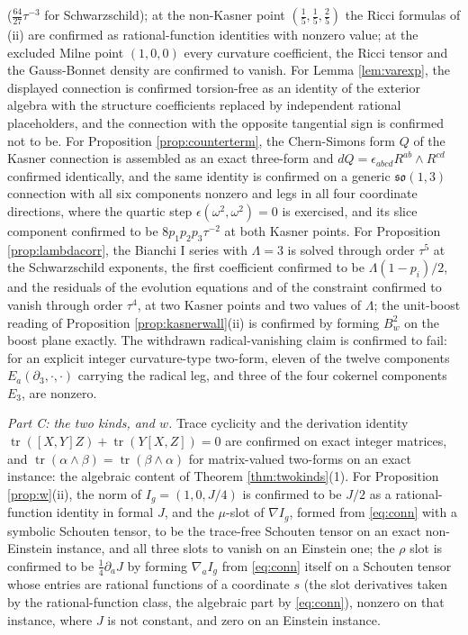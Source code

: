 \documentclass[11pt]{article}
\theoremstyle{definition}
\begin{document}
($\tfrac{64}{27}\tau^{-3}$ for Schwarzschild); at the non-Kasner point $(\tfrac15,\tfrac15,\tfrac25)$ the Ricci formulas of (ii) are confirmed as rational-function identities with nonzero value; at the excluded Milne point $(1,0,0)$ every curvature coefficient, the Ricci tensor and the Gauss-Bonnet density are confirmed to vanish. For Lemma \ref{lem:varexp}, the displayed connection is confirmed torsion-free as an identity of the exterior algebra with the structure coefficients replaced by independent rational placeholders, and the connection with the opposite tangential sign is confirmed not to be. For Proposition \ref{prop:counterterm}, the Chern-Simons form $Q$ of the Kasner connection is assembled as an exact three-form and $dQ = \epsilon_{abcd}R^{ab}\wedge R^{cd}$ confirmed identically, and the same identity is confirmed on a generic $\mathfrak{so}(1,3)$ connection with all six components nonzero and legs in all four coordinate directions, where the quartic step $\epsilon(\omega^2,\omega^2) = 0$ is exercised, and its slice component confirmed to be $8p_1p_2p_3\tau^{-2}$ at both Kasner points. For Proposition \ref{prop:lambdacorr}, the Bianchi I series with $\Lambda = 3$ is solved through order $\tau^5$ at the Schwarzschild exponents, the first coefficient confirmed to be $\Lambda(1-p_i)/2$, and the residuals of the evolution equations and of the constraint confirmed to vanish through order $\tau^4$, at two Kasner points and two values of $\Lambda$; the unit-boost reading of Proposition \ref{prop:kasnerwall}(ii) is confirmed by forming $B_w^2$ on the boost plane exactly. The withdrawn radical-vanishing claim is confirmed to fail: for an explicit integer curvature-type two-form, eleven of the twelve components $E_a(\partial_3, \cdot, \cdot)$ carrying the radical leg, and three of the four cokernel components $E_3$, are nonzero.

\emph{Part C: the two kinds, and $w$.} Trace cyclicity and the derivation identity $\operatorname{tr}([X,Y]Z) + \operatorname{tr}(Y[X,Z]) = 0$ are confirmed on exact integer matrices, and $\operatorname{tr}(\alpha\wedge\beta) = \operatorname{tr}(\beta\wedge\alpha)$ for matrix-valued two-forms on an exact instance: the algebraic content of Theorem \ref{thm:twokinds}(1). For Proposition \ref{prop:w}(ii), the norm of $I_g = (1, 0, J/4)$ is confirmed to be $J/2$ as a rational-function identity in formal $J$, and the $\mu$-slot of $\nabla I_g$, formed from \eqref{eq:conn} with a symbolic Schouten tensor, to be the trace-free Schouten tensor on an exact non-Einstein instance, and all three slots to vanish on an Einstein one; the $\rho$ slot is confirmed to be $\tfrac14\partial_aJ$ by forming $\nabla_a I_g$ from \eqref{eq:conn} itself on a Schouten tensor whose entries are rational functions of a coordinate $s$ (the slot derivatives taken by the rational-function class, the algebraic part by \eqref{eq:conn}), nonzero on that instance, where $J$ is not constant, and zero on an Einstein instance.
\end{document}
